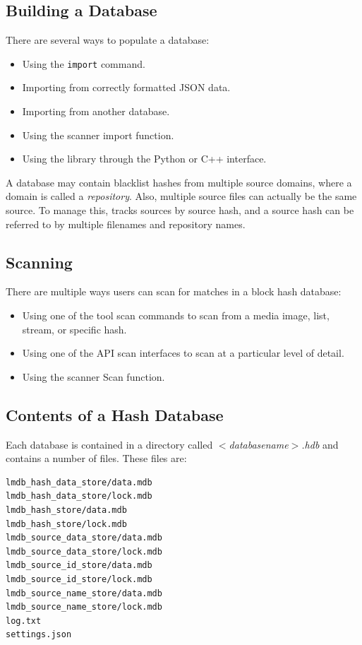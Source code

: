 \documentclass[11pt,fleqn]{article} %
\begin{document}
\subsection{Building a \hdb Database}
There are several ways to populate a database:

\begin{itemize}
\item Using the \hdb \verb+import+ command.
\item Importing from correctly formatted JSON data.
\item Importing from another database.
\item Using the \bulk \hdb scanner import function.
\item Using the \hdb library through the Python or C++ interface.
\end{itemize}

A database may contain blacklist hashes from multiple source domains,
where a domain is called a \textit{repository}.
Also, multiple source files can actually be the same source.
To manage this, \hdb tracks sources by source hash,
and a source hash can be referred to by multiple filenames and repository names.

\subsection{Scanning}
There are multiple ways users can scan for matches in a block hash database:

\begin{itemize}
\item Using one of the \hdb tool scan commands to scan from a media image,
list, stream, or specific hash.
\item Using one of the \hdb API scan interfaces to scan at a particular
level of detail.
\item Using the \bulk \hdb scanner Scan function.
\end{itemize}

\subsection{Contents of a Hash Database}
Each \hdb database is contained in a directory called \textit{$<$databasename$>$.hdb} and contains a number of files. These files are:
\begin{verbatim}
lmdb_hash_data_store/data.mdb
lmdb_hash_data_store/lock.mdb
lmdb_hash_store/data.mdb
lmdb_hash_store/lock.mdb
lmdb_source_data_store/data.mdb
lmdb_source_data_store/lock.mdb
lmdb_source_id_store/data.mdb
lmdb_source_id_store/lock.mdb
lmdb_source_name_store/data.mdb
lmdb_source_name_store/lock.mdb
log.txt
settings.json
\end{verbatim}
\end{document}
